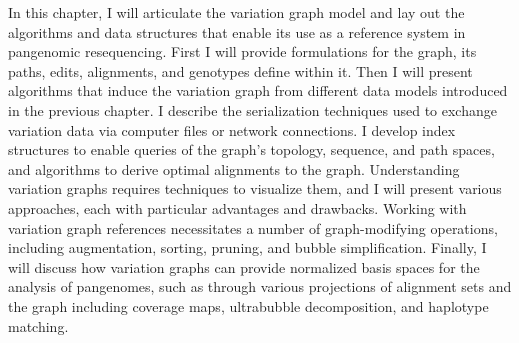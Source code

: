 \documentclass[a4paper,12pt,numbered,oneside]{Classes/PhDThesisPSnPDF}
\begin{document}
In this chapter, I will articulate the variation graph model and lay out the algorithms and data structures that enable its use as a reference system in pangenomic resequencing.
First I will provide formulations for the graph, its paths, edits, alignments, and genotypes define within it.
Then I will present algorithms that induce the variation graph from different data models introduced in the previous chapter.
I describe the serialization techniques used to exchange variation data via computer files or network connections.
I develop index structures to enable queries of the graph's topology, sequence, and path spaces, and algorithms to derive optimal alignments to the graph.
Understanding variation graphs requires techniques to visualize them, and I will present various approaches, each with particular advantages and drawbacks.
Working with variation graph references necessitates a number of graph-modifying operations, including augmentation, sorting, pruning, and bubble simplification.
Finally, I will discuss how variation graphs can provide normalized basis spaces for the analysis of pangenomes, such as through various projections of alignment sets and the graph including coverage maps, ultrabubble decomposition, and haplotype matching.
\end{document}
